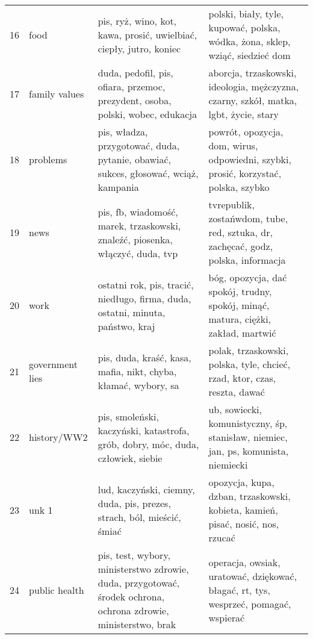 \begin{tabular}{p{2cm}p{2cm}p{5cm}p{5cm}}
          16 &                     food &                                              pis, ryż, wino, kot, kawa, prosić, uwielbiać, ciepły, jutro, koniec &                                           polski, biały, tyle, kupować, polska, wódka, żona, sklep, wziąć, siedzieć dom \\
          17 &            family values &                                   duda, pedofil, pis, ofiara, przemoc, prezydent, osoba, polski, wobec, edukacja &                                    aborcja, trzaskowski, ideologia, mężczyzna, czarny, szkół, matka, lgbt, życie, stary \\
          18 &                 problems &                              pis, władza, przygotować, duda, pytanie, obawiać, sukces, głosować, wciąż, kampania &                                     powrót, opozycja, dom, wirus, odpowiedni, szybki, prosić, korzystać, polska, szybko \\
          19 &                     news &                                    pis, fb, wiadomość, marek, trzaskowski, znaleźć, piosenka, włączyć, duda, tvp &                                       tvrepublik, zostańwdom, tube, red, sztuka, dr, zachęcać, godz, polska, informacja \\
          20 &                     work &                                  ostatni rok, pis, tracić, niedługo, firma, duda, ostatni, minuta, państwo, kraj &                                       bóg, opozycja, dać spokój, trudny, spokój, minąć, matura, ciężki, zakład, martwić \\
          21 &          government lies &                                                   pis, duda, kraść, kasa, mafia, nikt, chyba, kłamać, wybory, sa &                                               polak, trzaskowski, polska, tyle, chcieć, rzad, ktor, czas, reszta, dawać \\
          22 &              history/WW2 &                                  pis, smoleński, kaczyński, katastrofa, grób, dobry, móc, duda, człowiek, siebie &                                      ub, sowiecki, komunistyczny, śp, stanisław, niemiec, jan, ps, komunista, niemiecki \\
          23 &                    unk 1 &                                           lud, kaczyński, ciemny, duda, pis, prezes, strach, ból, mieścić, śmiać &                                          opozycja, kupa, dzban, trzaskowski, kobieta, kamień, pisać, nosić, nos, rzucać \\
          24 &            public health &  pis, test, wybory, ministerstwo zdrowie, duda, przygotować, środek ochrona, ochrona zdrowie, ministerstwo, brak &                                     operacja, owsiak, uratować, dziękować, błagać, rt, tys, wesprzeć, pomagać, wspierać \\

\end{tabular}
